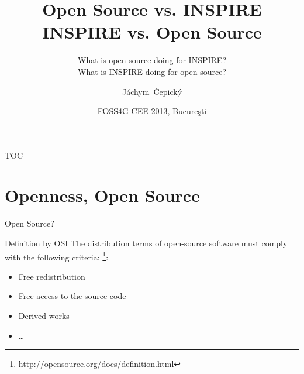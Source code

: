 \documentclass[xcolor=dvipsnames]{beamer}
\title[Open Source] %
{Open Source vs. INSPIRE\\INSPIRE vs. Open Source}
\subtitle {What is open source doing for INSPIRE?\\What is INSPIRE doing for
open source?}
\author[J. Čepický] %
{Jáchym~Čepický\inst{1}\inst{2}}
\institute %
{
  \inst{1}%
  Help Service - Remote Sensing s.r.o. \\
  Benešov\\
  \url{http://hsrs.cz}\\

  \inst{2}%
  OSGeo
  \url{http://osgeo.org}\\
}
\date[] %
{FOSS4G-CEE 2013, Bucure\c{s}ti}
\begin{document}
\begin{frame}
  \titlepage
\end{frame}

\begin{frame}{TOC}
  \tableofcontents
\end{frame}





\section{Openness, Open Source}

\begin{frame}{Open Source?}

\begin{block}{Definition by OSI}
    The distribution terms of open-source software must comply with the following criteria: \footnote{http://opensource.org/docs/definition.html}:
    \begin{itemize} 
        \item Free redistribution 
        \item Free access to the source code
        \item Derived works
        \item \dots
    \end{itemize}
\end{block}
\end{frame}
\end{document}
